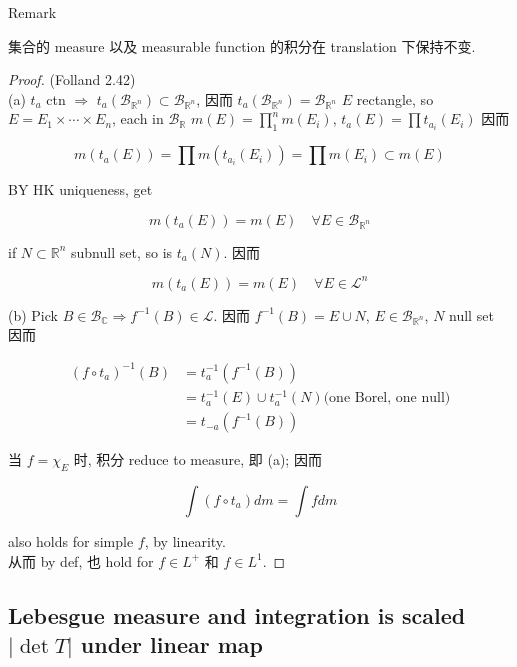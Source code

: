 \begin{qlremark}{Remark}

集合的 measure 以及 measurable function 的积分在 translation 下保持不变.

\end{qlremark}

\begin{proof}

(Folland 2.42)\\
(a) \(t_{a}\) ctn \(\Longrightarrow\) \(t_{a}(\mathcal{B}_{\mathbb{R}^{n}}) \subset \mathcal{B}_{\mathbb{R}^{n}}\), 因而 \(t_{a}(\mathcal{B}_{\mathbb{R}^{n}}) = \mathcal{B}_{\mathbb{R}^{n}}\) \(E\) rectangle, so \(E = E_{1} \times \cdots \times E_{n}\), each in \(\mathcal{B}_{\mathbb{R}}\) \(m(E) = \prod_{1}^{n}m(E_{i})\), \(t_{a}(E) = \prod t_{a_{i}}(E_{i})\) 因而

\[m(t_{a}(E)) = \prod m(t_{a_{i}}(E_{i})) = \prod m(E_{i}) \subset m(E)\]

BY HK uniqueness, get

\[m(t_{a}(E)) = m(E)\quad\forall E \in \mathcal{B}_{\mathbb{R}^{n}}\]

if \(N \subset \mathbb{R}^{n}\) subnull set, so is \(t_{a}(N)\). 因而

\[m(t_{a}(E)) = m(E)\quad\forall E \in \mathcal{L}^{n}\]

(b) Pick \(B \in \mathcal{B}_{\mathbb{C}}\Longrightarrow f^{- 1}(B) \in \mathcal{L}\). 因而 \(f^{- 1}(B) = E \cup N\), \(E \in \mathcal{B}_{\mathbb{R}^{n}}\), \(N\) null set 因而

\[\begin{matrix}
{(f \circ t_{a})^{- 1}(B)} & {= t_{a}^{- 1}(f^{- 1}(B))} \\
 & {= t_{a}^{- 1}(E) \cup t_{a}^{- 1}(N)\text{(one Borel, one null)}} \\
 & {= t_{- a}(f^{- 1}(B))}
\end{matrix}\]

当 \(f = \chi_{E}\) 时, 积分 reduce to measure, 即 (a); 因而

\[\int(f \circ t_{a}) dm = \int f dm\]

also holds for simple \(f\), by linearity.\\
从而 by def, 也 hold for \(f \in L^{+}\) 和 \(f \in L^{1}\).

\end{proof}

\subsection{\texorpdfstring{Lebesgue measure and integration is scaled \(|\det T|\) under linear map}{Lebesgue measure and integration is scaled \textbar\textbackslash det T\textbar{} under linear map}}\label{lebesgue-measure-and-integration-is-scaled-det-t-under-linear-map}

